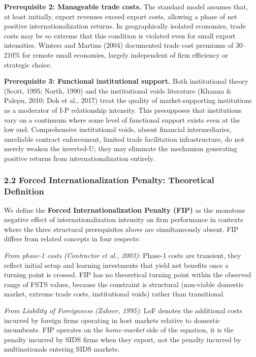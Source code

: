 \documentclass[12pt,a4paper]{article}
\begin{document}
\textbf{Prerequisite 2: Manageable trade costs.} The standard model
assumes that, at least initially, export revenues exceed export costs,
allowing a phase of net positive internationalization returns. In
geographically isolated economies, trade costs may be so extreme that
this condition is violated even for small export intensities. Winters
and Martins (2004) documented trade cost premiums of 30--210\% for
remote small economies, largely independent of firm efficiency or
strategic choice.

\textbf{Prerequisite 3: Functional institutional support.} Both
institutional theory (Scott, 1995; North, 1990) and the institutional
voids literature (Khanna \& Palepu, 2010; Doh et al., 2017) treat the
quality of market-supporting institutions as a moderator of I-P
relationship intensity. This presupposes that institutions vary on a
continuum where some level of functional support exists even at the low
end. Comprehensive institutional voids, absent financial intermediaries,
unreliable contract enforcement, limited trade facilitation
infrastructure, do not merely weaken the inverted-U; they may eliminate
the mechanism generating positive returns from internationalization
entirely.

\hypertarget{22-forced-internationalization-penalty-theoretical-definition}{%
\subsubsection{2.2 Forced Internationalization Penalty: Theoretical
Definition}\label{22-forced-internationalization-penalty-theoretical-definition}}

We define the \textbf{Forced Internationalization Penalty (FIP)} as the
monotone negative effect of internationalization intensity on firm
performance in contexts where the three structural prerequisites above
are simultaneously absent. FIP differs from related concepts in four
respects:

\emph{From phase-1 costs (Contractor et al., 2003)}: Phase-1 costs are
transient, they reflect initial setup and learning investments that
yield net benefits once a turning point is crossed. FIP has no
theoretical turning point within the observed range of FSTS values,
because the constraint is structural (non-viable domestic market,
extreme trade costs, institutional voids) rather than transitional.

\emph{From Liability of Foreignness (Zaheer, 1995)}: LoF denotes the
additional costs incurred by foreign firms operating in host markets
relative to domestic incumbents. FIP operates on the \emph{home-market}
side of the equation, it is the penalty incurred by SIDS firms when they
export, not the penalty incurred by multinationals entering SIDS
markets.
\end{document}
